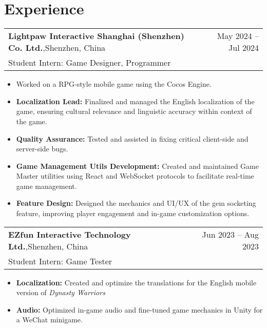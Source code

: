 \documentclass[oneside, 11pt]{article}
\newcommand*{\experienceEntry}[4]{
	\noindent
	\begin{tabularx}{\textwidth}{Xr}
	\textbf{#1},\quad #2 & #3\\
	#4
	\end{tabularx}
	\vspace{-0.75\baselineskip}
}
\newenvironment{expD}
	{\begin{itemize}[noitemsep,topsep=0pt]}
	{\end{itemize}}
\begin{document}
\section*{Experience}

\experienceEntry{Lightpaw Interactive Shanghai (Shenzhen) Co. Ltd.}
	{Shenzhen, China}
	{May 2024 -- Jul 2024}
	{Student Intern: Game Designer, Programmer}

\begin{expD}
	\item Worked on a RPG-style mobile game using the Cocos Engine.
	\item \textbf{Localization Lead:} Finalized and managed the English localization of the game, ensuring cultural relevance and linguistic accuracy within context of the game.
	\item \textbf{Quality Assurance:} Tested and assisted in fixing critical client-side and server-side bugs.
	\item \textbf{Game Management Utils Development:} Created and maintained Game Master utilities using React and WebSocket protocols to facilitate real-time game management.
	\item \textbf{Feature Design:} Designed the mechanics and UI/UX of the gem socketing feature, improving player engagement and in-game customization options.
\end{expD}

\experienceEntry{EZfun Interactive Technology Ltd.}
	{Shenzhen, China}
	{Jun 2023 -- Aug 2023}
	{Student Intern: Game Tester}

\begin{expD}
	\item \textbf{Localization:} Created and optimize the translations for the English mobile version of \textit{Dynasty Warriors}
	\item \textbf{Audio:} Optimized in-game audio and fine-tuned game mechanics in Unity for a WeChat minigame.
\end{expD}



\end{document}
